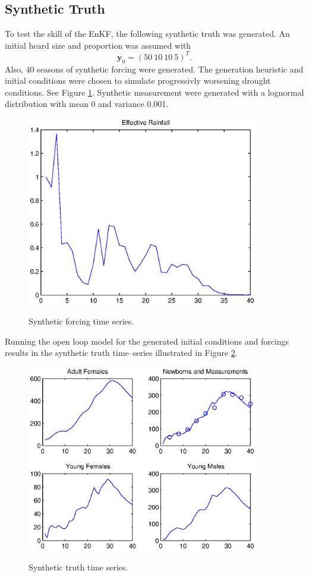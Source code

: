 \documentclass[fleqn, letterpaper]{amsart}
\newcommand{\vecy}{\mathbf{y}}
\begin{document}
\subsection{Synthetic Truth}
To test the skill of the EnKF, the following synthetic truth was generated. An initial heard size and proportion was assumed with
\[\vecy_0 = (50\ 10\ 10\ 5)^T.\]
Also, 40 seasons of synthetic forcing were generated. The generation heuristic and initial conditions were chosen to simulate progressivly worsening drought conditions. See Figure \ref{forcing}.
Synthetic measurement were generated with a lognormal distribution with mean 0 and variance 0.001. 
\begin{figure}
\includegraphics[width=0.9\textwidth]{rforcing}
\label{forcing}
\caption{Synthetic forcing time series.}
\end{figure}
Running the open loop model for the generated initial conditions and forcings results in the synthetic truth time--series illustrated in Figure \ref{rtruth}.
\begin{figure}
\includegraphics[width=0.9\textwidth]{rtruth}
\label{rtruth}
\caption{Synthetic truth time series.}
\end{figure}
\end{document}
